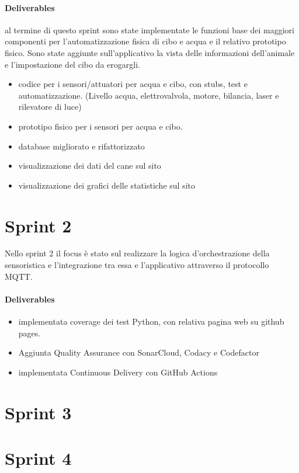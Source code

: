 \paragraph{Deliverables}
al termine di questo sprint sono state implementate le funzioni base dei maggiori componenti per l'automatizzazione fisica di cibo e acqua e il relativo prototipo fisico. Sono state aggiunte sull'applicativo la vista delle informazioni dell'animale e l'impostazione del cibo da erogargli. 
\begin{itemize}
    \item codice per i sensori/attuatori per acqua e cibo, con stubs, test e automatizzazione. (Livello acqua, elettrovalvola, motore, bilancia, laser e rilevatore di luce)
    \item prototipo fisico per i sensori per acqua e cibo. 
    \item database migliorato e rifattorizzato
    \item visualizzazione dei dati del cane sul sito 
    \item visualizzazione dei grafici delle statistiche sul sito 
\end{itemize}

\section{Sprint 2}
Nello sprint 2 il focus è stato sul realizzare la logica d'orchestrazione della sensoristica e l'integrazione tra essa e l'applicativo attraverso il protocollo MQTT.
\paragraph{Deliverables}
\begin{itemize}
    \item implementata coverage dei test Python, con relativa pagina web su github pages. 
    \item Aggiunta Quality Assurance con SonarCloud, Codacy e Codefactor
    \item implementata Continuous Delivery con GitHub Actions
\end{itemize}

\section{Sprint 3}


\section{Sprint 4}


